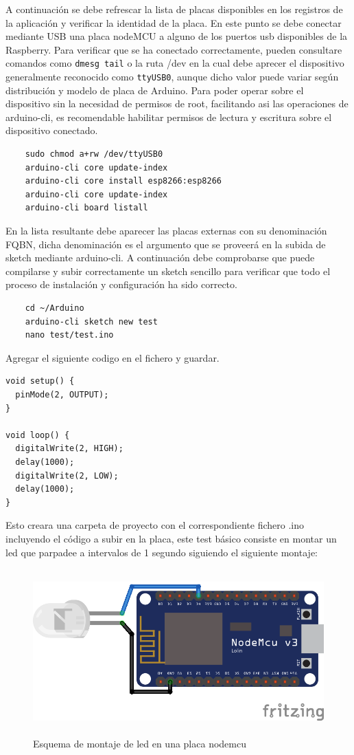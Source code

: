 A continuación se debe refrescar la lista de placas disponibles en los registros de la aplicación y verificar la identidad de la placa. En este punto se debe conectar mediante USB una placa nodeMCU a alguno de los puertos \gls{usb} disponibles de la Raspberry. Para verificar que se ha conectado correctamente, pueden consultare comandos como \verb|dmesg tail| o la ruta /dev en la cual debe aprecer el dispositivo generalmente reconocido como \verb|ttyUSB0|, aunque dicho valor puede variar según distribución y modelo de placa de Arduino. Para poder operar sobre el dispositivo sin la necesidad de permisos de root, facilitando asi las operaciones de arduino-cli, es recomendable habilitar permisos de lectura y escritura sobre el dispositivo conectado.

\begin{verbatim}
    sudo chmod a+rw /dev/ttyUSB0
    arduino-cli core update-index
    arduino-cli core install esp8266:esp8266
    arduino-cli core update-index
    arduino-cli board listall
\end{verbatim}

En la lista resultante debe aparecer las placas externas con su denominación FQBN, dicha denominación es el argumento que se proveerá en la subida de \gls{sketch} mediante arduino-cli. A continuación debe comprobarse que puede compilarse y subir correctamente un  \gls{sketch} sencillo para verificar que todo el proceso de instalación y configuración ha sido correcto.

\begin{verbatim}
    cd ~/Arduino
    arduino-cli sketch new test
    nano test/test.ino
\end{verbatim}

Agregar el siguiente codigo en el fichero y guardar.
\begin{verbatim}
void setup() {
  pinMode(2, OUTPUT);
}

void loop() {
  digitalWrite(2, HIGH);
  delay(1000);
  digitalWrite(2, LOW);
  delay(1000);
}
\end{verbatim}

Esto creara una carpeta de proyecto con el correspondiente fichero .ino incluyendo el código a subir en la placa, este test básico consiste en montar un led que parpadee a intervalos de 1 segundo siguiendo el siguiente montaje:

\begin{figure}[hbt!]
\centering
\includegraphics[height=2.5in]{figures/nodemcu-test1.png}
\caption[Montaje placa nodeMCU con led]{Esquema de montaje de led en una placa nodemcu}
    \label{figure1}
\end{figure}

